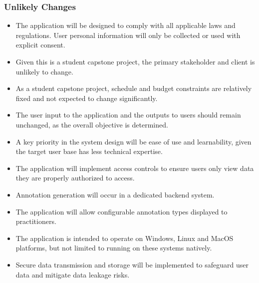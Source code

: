 \documentclass[12pt]{article}
\begin{document}
\subsubsection*{Unlikely Changes}
\begin{itemize}
  \item The application will be designed to comply with all applicable laws and regulations\cite{Law1}\cite{Law2}\cite{Law3}. User personal information will only be collected or used with explicit consent.
  \item Given this is a student capstone project, the primary stakeholder and client is unlikely to change.
  \item As a student capstone project, schedule and budget constraints are relatively fixed and not expected to change significantly.
  \item The user input to the application and the outputs to users should remain unchanged, as the overall objective is determined.
  \item A key priority in the system design will be ease of use and learnability, given the target user base has less technical expertise.
  \item The application will implement access controls to ensure users only view data they are properly authorized to access.
  \item Annotation generation will occur in a dedicated backend system.
  \item The application will allow configurable annotation types displayed to practitioners.
  \item The application is intended to operate on Windows, Linux and MacOS platforms, but not limited to running on these systems natively.
  \item Secure data transmission and storage will be implemented to safeguard user data and mitigate data leakage risks.
\end{itemize}

\printbibliography
\end{document}
